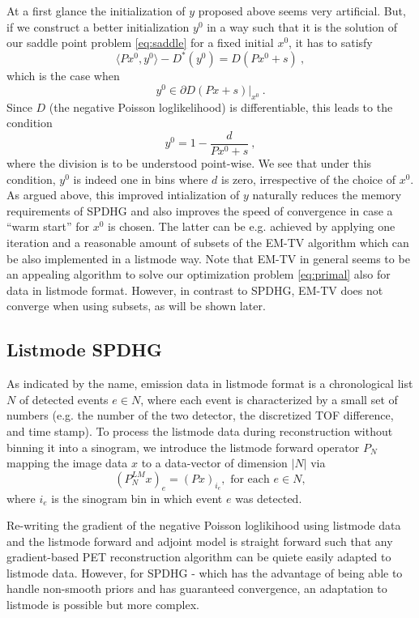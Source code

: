 At a first glance the initialization of $y$ proposed above seems very artificial.
But, if we construct a better initialization $y^0$ in a way such that it is the solution of our
saddle point problem \eqref{eq:saddle} for a fixed initial $x^0$, it has to satisfy
%
\begin{equation}
\langle P x^0, y^0 \rangle - D^*(y^0) = D(Px^0 + s) \ ,
\end{equation}
%
which is the case when
%
\begin{equation}
y^0 \in \partial D(Px + s) |_{x^0} \ .
\end{equation}
%
Since $D$ (the negative Poisson loglikelihood) is differentiable, this leads
to the condition
\begin{equation}
y^0 = 1 - \frac{d}{Px^0 + s} \ ,
\label{eq:yinit}
\end{equation}
where the division is to be understood point-wise.
We see that under this condition, $y^0$ is indeed one in bins where $d$ is zero,
irrespective of the choice of $x^0$.
As argued above, this improved intialization of $y$ naturally reduces the 
memory requirements of SPDHG and also improves the speed of convergence in case a
``warm start'' for $x^0$ is chosen. 
The latter can be e.g. achieved by applying one iteration
and a reasonable amount of subsets of the EM-TV algorithm \cite{Sawatzky2008, Burger2008} 
which can be also implemented in a listmode way. 
Note that EM-TV in general seems to be an appealing algorithm to solve our optimization
problem \eqref{eq:primal} also for data in listmode format.
However, in contrast to SPDHG, EM-TV does not converge when using subsets, as will
be shown later.

\subsection*{Listmode SPDHG}

As indicated by the name, emission data in listmode format is a chronological list $N$ of detected 
events $e \in N$, where each event is characterized by a small set of numbers 
(e.g. the number of the two detector, the discretized TOF difference, and time stamp).
To process the listmode data during reconstruction without binning it into a sinogram,
we introduce the listmode forward operator $P_N$ mapping the image data $x$ to a 
data-vector of dimension $|N|$ via \[ (P^{LM}_N x)_e  = (Px)_{i_e} , \text{ for each }e \in N,\]
where $i_e$ is the sinogram bin in which event $e$ was detected.

Re-writing the gradient of the negative Poisson loglikihood using listmode data and the
listmode forward and adjoint model is straight forward such that any gradient-based
PET reconstruction algorithm can be quiete easily adapted to listmode data.
However, for SPDHG - which has the advantage of being able to handle non-smooth priors and
has guaranteed convergence, an adaptation to listmode is possible but more complex.

